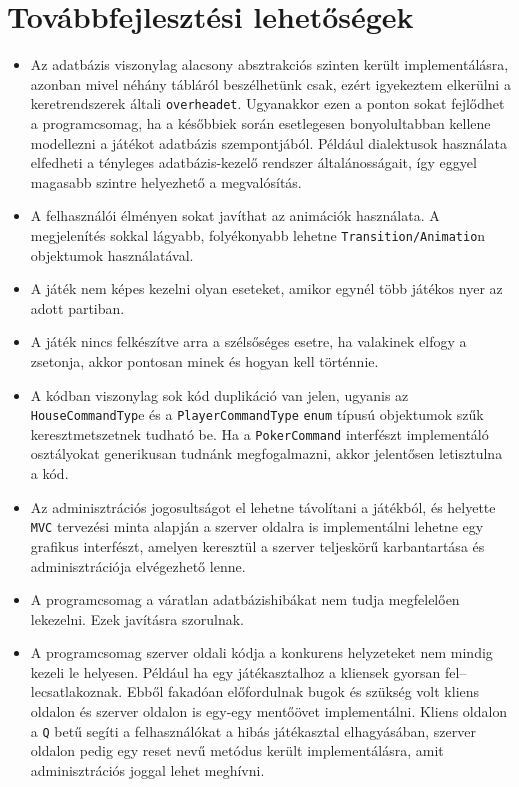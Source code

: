 \section{Továbbfejlesztési lehetőségek}
\begin{itemize}
\item Az adatbázis viszonylag alacsony absztrakciós szinten került implementálásra, azonban mivel néhány tábláról beszélhetünk csak, ezért igyekeztem elkerülni a keretrendszerek általi \texttt{overheadet}. Ugyanakkor ezen a ponton sokat fejlődhet a programcsomag, ha a későbbiek során esetlegesen bonyolultabban kellene modellezni a játékot adatbázis szempontjából. Például dialektusok használata elfedheti a tényleges adatbázis-kezelő rendszer általánosságait, így eggyel magasabb szintre helyezhető a megvalósítás.
\item A felhasználói élményen sokat javíthat az animációk használata. A megjelenítés sokkal lágyabb, folyékonyabb lehetne \texttt{Transition/Animatio}n\cite{animations} objektumok használatával.
\item A játék nem képes kezelni olyan eseteket, amikor egynél több játékos nyer az adott partiban.
\item A játék nincs felkészítve arra a szélsőséges esetre, ha valakinek elfogy a zsetonja, akkor pontosan minek és hogyan kell történnie.
\item A kódban viszonylag sok kód duplikáció van jelen, ugyanis az \texttt{HouseCommandTyp}e és a \texttt{PlayerCommandType} \texttt{enum} típusú objektumok szűk keresztmetszetnek tudható be. Ha a \texttt{PokerCommand} interfészt implementáló osztályokat generikusan tudnánk megfogalmazni, akkor jelentősen letisztulna a kód.
\item Az adminisztrációs jogosultságot el lehetne távolítani a játékból, és helyette \texttt{MVC} tervezési minta alapján a szerver oldalra is implementálni lehetne egy grafikus interfészt, amelyen keresztül a szerver teljeskörű karbantartása és adminisztrációja elvégezhető lenne.
\item A programcsomag a váratlan adatbázishibákat nem tudja megfelelően lekezelni. Ezek javításra szorulnak.
\item A programcsomag szerver oldali kódja a konkurens helyzeteket nem mindig kezeli le helyesen. Például ha egy játékasztalhoz a kliensek gyorsan fel--lecsatlakoznak. Ebből fakadóan előfordulnak bugok és szükség volt kliens oldalon és szerver oldalon is egy-egy mentőövet implementálni. Kliens oldalon a \texttt{Q} betű segíti a felhasználókat a hibás játékasztal elhagyásában, szerver oldalon pedig egy reset nevű metódus került implementálásra, amit adminisztrációs joggal lehet meghívni.
\end{itemize}


\clearpage
